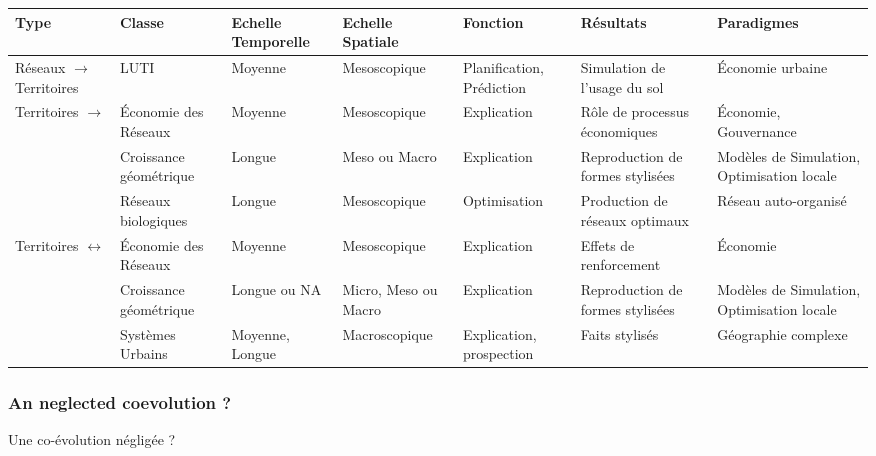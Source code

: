 \begin{table}
{\begin{tabular}{|p{2.5cm}|p{2cm}|p{2.5cm}|p{2.5cm}|p{2.1cm}|p{2.2cm}|p{2cm}|}
\hline
Type & Classe & Echelle Temporelle & Echelle Spatiale & Fonction & Résultats & Paradigmes\\ \hline
Réseaux $\rightarrow$ Territoires & LUTI & Moyenne & Mesoscopique & Planification, Prédiction & Simulation de l'usage du sol & Économie urbaine \\ \hline
\multirow{3}{*}{Territoires $\rightarrow$}& Économie des Réseaux & Moyenne & Mesoscopique & Explication & Rôle de processus économiques & Économie, Gouvernance\\\cline{2-7}
Réseaux& Croissance géométrique & Longue & Meso ou Macro & Explication & Reproduction de formes stylisées & Modèles de Simulation, Optimisation locale \\\cline{2-7}
& Réseaux biologiques & Longue & Mesoscopique & Optimisation & Production de réseaux optimaux & Réseau auto-organisé \\ \hline
\multirow{2}{*}{Territoires $\leftrightarrow$}& Économie des Réseaux & Moyenne & Mesoscopique & Explication & Effets de renforcement & Économie\\\cline{2-7}
Réseaux & Croissance géométrique & Longue ou NA & Micro, Meso ou Macro & Explication & Reproduction de formes stylisées & Modèles de Simulation, Optimisation locale \\\cline{2-7}
& Systèmes Urbains & Moyenne, Longue & Macroscopique & Explication, prospection & Faits stylisés & Géographie complexe\\\hline
\end{tabular}
}
\end{table}






\subsubsection*{An neglected coevolution ?}{Une co-évolution négligée ?}

